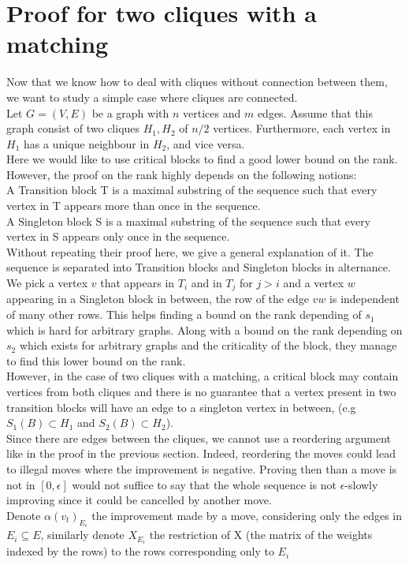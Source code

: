 \section{Proof for two cliques with a matching}
Now that we know how to deal with cliques without connection between them, we want to study a simple case where cliques are connected. \\
Let $G = (V,E)$ be a graph with $n$ vertices and $m$ edges. Assume that this graph consist of two cliques $H_1, H_2$ of $n/2$ vertices. Furthermore, each vertex in $H_1$ has a unique neighbour in $H_2$, and vice versa. \\
Here we would like to use critical blocks to find a good lower bound on the rank. However, the proof on the rank \cite{angel2016local} highly depends on the following notions:\\
A Transition block T is a maximal substring of the sequence such that every vertex in T appears more than once in the sequence. \\
A Singleton block S is a maximal substring of the sequence  such that every vertex in S appears only once in the sequence. \\
Without repeating their proof here, we give a general explanation of it. The sequence is separated into Transition blocks and Singleton blocks in alternance. We pick a vertex $v$ that appears in $T_i$ and in $T_j$ for $ j > i$ and a vertex $w$ appearing in a Singleton block in between, the row of the edge $vw$ is independent of many other rows. This helps finding a bound on the rank depending of $s_1$ which is hard for arbitrary graphs. Along with a bound on the rank depending on $s_2$ which exists for arbitrary graphs and the criticality of the block, they manage to find this lower bound on the rank.\\
However, in the case of two cliques with a matching, a critical block may contain vertices from both cliques and there is no guarantee that a vertex present in two transition blocks will have an edge to a singleton vertex in between, (e.g $S_1(B) \subset H_1$ and $S_2(B) \subset H_2$).\\ 
Since there are edges between the cliques, we cannot use a reordering argument like in the proof in the previous section. Indeed, reordering the moves could lead to illegal moves where the improvement is negative. Proving then than a move is not in $[0, \epsilon]$ would not suffice to say that the whole sequence is not $\epsilon$-slowly improving since it could be cancelled by another move.\\
Denote $\alpha(v_t)_{E_i}$ the improvement made by a move, considering only the edges in $E_i \subseteq E$, similarly denote $X_{E_i}$ the restriction of X (the matrix of the weights indexed by the rows) to the rows corresponding only to $E_i$ 


